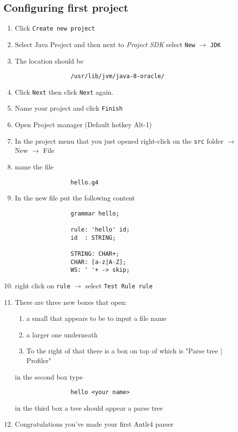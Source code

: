 \documentclass{article}
\begin{document}
	\subsection{Configuring first project}
		\begin{enumerate}
			\item Click \texttt{Create new project}

			\item Select Java Project and then next to \textit{Project SDK} select \texttt{New} $\rightarrow$ \texttt{JDK}

			\item The location should be
			\begin{lstlisting}
				/usr/lib/jvm/java-8-oracle/
			\end{lstlisting}

			\item Click \texttt{Next} then click \texttt{Next} again.

			\item Name your project and click \texttt{Finish}

			\item Open Project manager (Default hotkey Alt-1)

			\item In the project menu that you just opened right-click on the \texttt{src} folder $\rightarrow$ New $\rightarrow$ File

			\item name the file
			\begin{lstlisting}
				hello.g4
			\end{lstlisting}

			\item In the new file put the following content
			\begin{lstlisting}
				grammar hello;

				rule: 'hello' id;
				id  : STRING;

				STRING: CHAR+;
				CHAR: [a-z|A-Z];
				WS: ' '+ -> skip;
			\end{lstlisting}

			\item right click on \texttt{rule} $\rightarrow$ select \texttt{Test Rule rule}

			\item There are three new boxes that open:
			\begin{enumerate}
				\item a small that appears to be to input a file name
				\item a larger one underneath
				\item To the right of that there is a box on top of which is "Parse tree | Profiler"
			\end{enumerate}
			in the second box type
			\begin{lstlisting}
				hello <your name>
			\end{lstlisting}
			in the third box a tree should appear a parse tree

			\item Congratulations you've made your first Antlr4 parser

		\end{enumerate}
\end{document}
